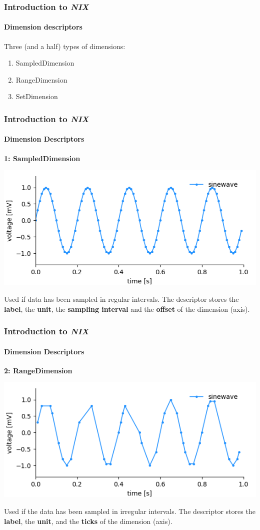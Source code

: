 \documentclass[pdftex, xcolor=table]{beamer}
\newcommand{\nix}{\textit{NIX}}
\begin{document}
\begin{frame}
  \frametitle{Introduction to \nix{}}
  \framesubtitle{Dimension descriptors}
  Three (and a half) types of dimensions:
  \begin{enumerate}
  \item SampledDimension
  \item RangeDimension
  \item SetDimension
  \end{enumerate}
\end{frame}


\begin{frame}
  \frametitle{Introduction to \nix{}}
  \framesubtitle{Dimension Descriptors}
  \noindent \textbf{1: SampledDimension}
  \begin{center}
    \includegraphics[width=0.85\linewidth]{images/regular_sampled.png}
  \end{center}
  \pause

  Used if data has been sampled in regular intervals. The descriptor
  stores the \textbf{label}, the \textbf{unit}, the \textbf{sampling
    interval} and the \textbf{offset} of the dimension (axis).
\end{frame}


\begin{frame}
  \frametitle{Introduction to \nix{}}
  \framesubtitle{Dimension Descriptors}
  \noindent \textbf{2: RangeDimension}
  \begin{center}
    \includegraphics[width=0.85\linewidth]{images/irregular_sampled.png}
  \end{center}
  \pause
  Used if the data has been sampled in irregular intervals. The descriptor stores the
  \textbf{label}, the \textbf{unit}, and the \textbf{ticks} of the dimension (axis).
\end{frame}
\end{document}
